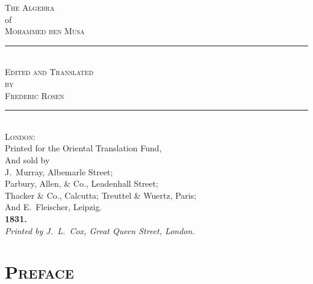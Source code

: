 
\newcommand{\vs}{\vspace{0.5em}}


\thispagestyle{empty}
\begin{center}
\vspace*{2cm}

{\fontsize{28}{34}\selectfont\scshape\color{titlecolor} The Algebra}\\[0.8cm]
{\fontsize{14}{18}\selectfont\color{sectioncolor} of}\\[0.8cm]
{\fontsize{28}{34}\selectfont\scshape\color{titlecolor} Mohammed ben Musa}\\[2cm]

\rule{0.5\textwidth}{1pt}\\[1cm]

{\Large\scshape Edited and Translated}\\[0.3cm]
{\Large\scshape by}\\[0.3cm]
{\Large\scshape Frederic Rosen}\\[2cm]

\rule{0.5\textwidth}{1pt}\\[1cm]

{\normalsize
\textsc{London}:\\
Printed for the Oriental Translation Fund,\\
And sold by\\
J.~Murray, Albemarle Street;\\
Parbury, Allen, \& Co., Leadenhall Street;\\
Thacker \& Co., Calcutta; Treuttel \& Wuertz, Paris;\\
And E.~Fleischer, Leipzig.\\[0.5cm]
\textbf{1831.}
}\\[1cm]

{\small\textit{Printed by J.~L.~Cox, Great Queen Street, London.}}

\vfill
\end{center}
\clearpage

\thispagestyle{empty}
\null\clearpage

\section*{\textsc{Preface}}

